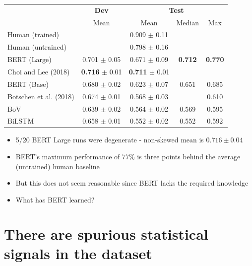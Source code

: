 \documentclass[a0,portrait]{a0poster}
\begin{document}
\begin{multicols}{2}
\begin{center}
\begin{tabular}{|l|c|ccc|}
\hline
\multirow{2}{*}{} & \multicolumn{1}{c|}{\textbf{Dev}} & \multicolumn{3}{c|}{\textbf{Test}} \\
& Mean & Mean & Median & Max \\
\hline
Human (trained) & & 0.909 $\pm$ 0.11 &  &  \\
Human (untrained) & & 0.798 $\pm$ 0.16 & &  \\
BERT (Large) & 0.701 $\pm$ 0.05 & 0.671 $\pm$ 0.09 & \textbf{0.712} & \textbf{0.770} \\
Choi and Lee (2018) & \textbf{0.716} $\pm$ 0.01 & \textbf{0.711} $\pm$ 0.01 & &  \\
BERT (Base) & 0.680 $\pm$ 0.02 & 0.623 $\pm$ 0.07 & 0.651 & 0.685 \\
Botschen et al. (2018) & 0.674 $\pm$ 0.01 & 0.568 $\pm$ 0.03 & & 0.610 \\
BoV & 0.639 $\pm$ 0.02 & 0.564 $\pm$ 0.02 & 0.569 & 0.595 \\
BiLSTM & 0.658 $\pm$ 0.01 & 0.552 $\pm$ 0.02 & 0.552 & 0.592 \\
\hline
\end{tabular}
\end{center}

\vspace{16pt}

\begin{itemize}
    \item 5/20 BERT Large runs were degenerate - non-skewed mean is $0.716 \pm 0.04$
    \item BERT's maximum performance of 77\% is three points behind the average (untrained) human baseline
    \item But this does not seem reasonable since BERT lacks the required knowledge
    \item What has BERT learned?
\end{itemize}

\section*{There are spurious statistical signals in the dataset}


\end{multicols}
\end{document}
